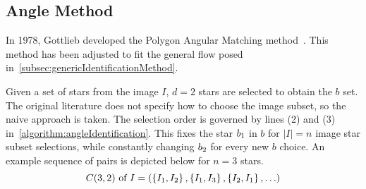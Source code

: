 
\subsection{Angle Method}\label{subsec:angleMethod}
In 1978, Gottlieb developed the Polygon Angular Matching method~\cite{Angle,AnalysisUncompensated}.
This method has been adjusted to fit the general flow posed in~\autoref{subsec:genericIdentificationMethod}.

Given a set of stars from the image $I$, $d = 2$ stars are selected to obtain the $b$ set.
The original literature does not specify how to choose the image subset, so the naive approach is taken.
The selection order is governed by lines (2) and (3) in~\autoref{algorithm:angleIdentification}.
This fixes the star $b_1$ in $b$ for $|I| = n$ image star subset selections, while constantly changing
$b_2$ for every new $b$ choice.
An example sequence of pairs is depicted below for $n = 3$ stars.
\begin{equation}
    C(3, 2) \text{ of } I = \left(\left\{ I_1, I_2 \right\}, \left\{ I_1,I_3 \right\}, \left\{ I_2,I_1 \right\},
    \ldots \right)
\end{equation}

